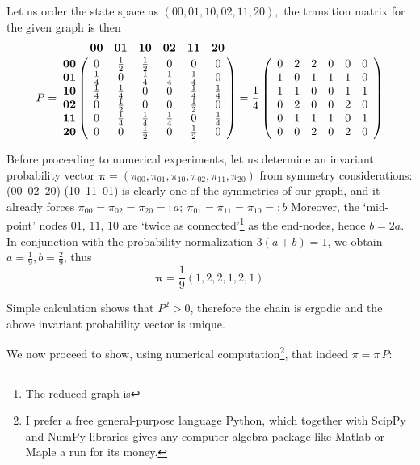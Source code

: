 \documentclass[8pt,notitlepage]{report}
\newenvironment{solution}[1][Solution]{\begin{trivlist}
    \item[\hskip \labelsep {\bfseries #1}]}{\end{trivlist}}
\begin{document}
\begin{solution}

Let us order the state space as $(00,01,10,02,11,20),$ the transition matrix for the given graph is then
$$
P = 
\bordermatrix{
  & \mathbf{00} & \mathbf{01} & \mathbf{10} &\mathbf{02} &\mathbf{11} &\mathbf{20} \cr
\mathbf{00} & 0  & \frac{1}{2}  &  \frac{1}{2} & 0  & 0  & 0 \cr
\mathbf{01} &  \frac{1}{4}  & 0  &  \frac{1}{4} & \frac{1}{4}  & \frac{1}{4}  & 0 \cr
\mathbf{10} & \frac{1}{4}  & \frac{1}{4}  &  0 & 0  & \frac{1}{4}  & \frac{1}{4} \cr
\mathbf{02} & 0  & \frac{1}{2}  &  0 & 0  & \frac{1}{2}  & 0 \cr
\mathbf{11} & 0  & \frac{1}{4}  &  \frac{1}{4} & \frac{1}{4}  & 0  & \frac{1}{4} \cr
\mathbf{20} & 0  & 0  &  \frac{1}{2} & 0  & \frac{1}{2}  & 0 \cr
}
=
\frac{1}{4}
\left(
\begin{array}{cccccc}
 0  & 2  &  2 & 0  & 0  & 0 \\
 1  & 0  &  1 & 1  & 1  & 0 \\
 1  & 1  &  0 & 0  & 1  & 1 \\
 0  & 2  &  0 & 0  & 2  & 0 \\
 0  & 1  &  1 & 1  & 0  & 1 \\
 0  & 0  &  2 & 0  & 2  & 0 \\
\end{array}
\right)
$$


Before proceeding to numerical experiments, let us determine an invariant probability vector 
$\mathbf{\pi} = (\pi_{00},\pi_{01},\pi_{10},\pi_{02},\pi_{11},\pi_{20})$
from symmetry considerations: (00\, 02\, 20) (10\, 11\, 01) is clearly one of the symmetries of our graph,
and it already forces $\pi_{00} = \pi_{02} = \pi_{20} =: a; \ \pi_{01} = \pi_{11} = \pi_{10} =: b$
Moreover, the `mid-point' nodes $01,\,11,\,10$ are `twice as connected'\footnote{ The reduced graph is 
 } as the end-nodes, hence $ b = 2a $.
In conjunction with the probability normalization $ 3(a+b) = 1 $, we obtain $ a = \frac{1}{9}, b = \frac{2}{9} $,
thus $$\mathbf{\pi} = \frac{1}{9} ( 1,2,2,1,2,1 ) $$


Simple calculation shows that $P^2 > 0$, therefore the chain is ergodic and the above invariant probability 
vector is unique.

We now proceed to show, using numerical computation\footnote{I prefer a free general-purpose language {\rm Python}, 
which together with ScipPy and NumPy libraries gives any computer algebra package like Matlab or Maple 
a run for its money.},
that indeed $\pi = \pi\,P$:


\end{solution}
\end{document}
